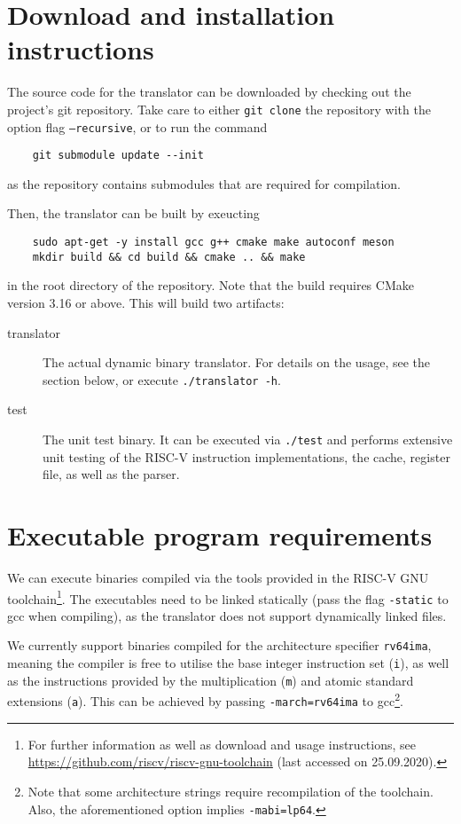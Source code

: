 \section{Download and installation instructions}
The source code for the translator can be downloaded by checking out the project's git repository.
Take care to either \texttt{git clone} the repository with the option flag \texttt{--recursive}, or to run the command
\begin{lstlisting}
	git submodule update --init
\end{lstlisting}
as the repository contains submodules that are required for compilation.

Then, the translator can be built by exeucting
\begin{lstlisting}
	sudo apt-get -y install gcc g++ cmake make autoconf meson
	mkdir build && cd build && cmake .. && make
\end{lstlisting}
in the root directory of the repository.
Note that the build requires CMake version 3.16 or above.
This will build two artifacts:
\begin{description}
	\item[translator] The actual dynamic binary translator.
	For details on the usage, see the section below, or execute \texttt{./translator -h}.
	
	\item[test] The unit test binary.
	It can be executed via \texttt{./test} and performs extensive unit testing of the RISC-V instruction implementations, the cache, register file, as well as the parser.
\end{description}

\section{Executable program requirements}
We can execute binaries compiled via the tools provided in the RISC-V GNU toolchain\footnote{For further information as well as download and usage instructions, see \url{https://github.com/riscv/riscv-gnu-toolchain} (last accessed on 25.09.2020).}.
The executables need to be linked statically (pass the flag \texttt{-static} to gcc when compiling), as the translator does not support dynamically linked files.

We currently support binaries compiled for the architecture specifier \texttt{rv64ima}, meaning the compiler is free to utilise the base integer instruction set (\texttt{i}), as well as the instructions provided by the multiplication (\texttt{m}) and atomic standard extensions (\texttt{a}).
This can be achieved by passing \texttt{-march=rv64ima} to gcc\footnote{Note that some architecture strings require recompilation of the toolchain. Also, the aforementioned option implies \texttt{-mabi=lp64}.}.

